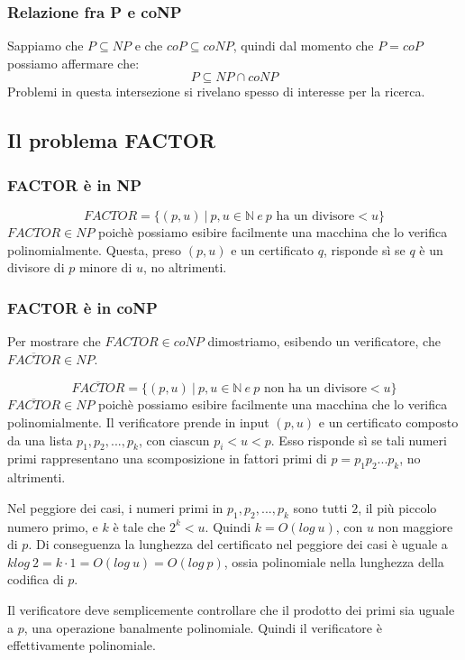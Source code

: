 \subsubsection{Relazione fra P e coNP}
Sappiamo che $P \subseteq NP$ e che $coP \subseteq coNP$, quindi dal momento che $P = coP$ possiamo affermare che:
\[
	P \subseteq NP \cap coNP
\]
Problemi in questa intersezione si rivelano spesso di interesse per la ricerca.
\subsection{Il problema FACTOR}
\subsubsection{FACTOR è in NP}
\[
	FACTOR = \{(p, u) \ | \  p,u \in \mathbb{N} \ e \ p \text{ ha un divisore} < u \} 
\]	
$FACTOR \in NP$ poichè possiamo esibire facilmente una macchina che lo verifica polinomialmente. Questa, preso $(p, u)$ e un certificato $q$, risponde sì se $q$ è un divisore di $p$ minore di $u$, no altrimenti.

\subsubsection{FACTOR è in coNP}
Per mostrare che $FACTOR \in coNP$ dimostriamo, esibendo un verificatore, che $\overline{FACTOR} \in NP$.

\[
	\overline{FACTOR} = \{(p, u) \ | \  p,u \in \mathbb{N} \ e \ p \text{ non ha un divisore} < u \} 
\]	
$\overline{FACTOR} \in NP$ poichè possiamo esibire facilmente una macchina che lo verifica polinomialmente. Il verificatore prende in input $(p, u)$ e un certificato composto da una lista $p_1,p_2,...,p_k$, con ciascun $p_i < u < p$. Esso risponde sì se tali numeri primi rappresentano una scomposizione in fattori primi di $p = p_1 p_2 ... p_k$, no altrimenti.

Nel peggiore dei casi, i numeri primi in $p_1, p_2, ..., p_k$ sono tutti $2$, il più piccolo numero primo, e $k$ è tale che $2^k < u$. Quindi $k = O(log \ u)$, con $u$ non maggiore di $p$. Di conseguenza la lunghezza del certificato nel peggiore dei casi è uguale a $k log \ 2 = k \cdot 1 = O(log \ u) = O(log \ p)$, ossia polinomiale nella lunghezza della codifica di $p$. 

Il verificatore deve semplicemente controllare che il prodotto dei primi sia uguale a $p$, una operazione banalmente polinomiale. Quindi il verificatore è effettivamente polinomiale.

